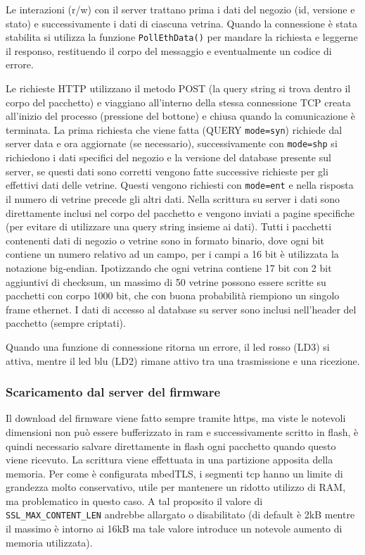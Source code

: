 
Le interazioni (r/w) con il server trattano prima i dati del negozio (id, versione e stato) e successivamente i dati di ciascuna vetrina. Quando la connessione \`e stata stabilita si utilizza la funzione \texttt{PollEthData()} per mandare la richiesta e leggerne il responso, restituendo il corpo del messaggio e eventualmente un codice di errore. 

Le richieste HTTP utilizzano il metodo POST (la query string si trova dentro il corpo del pacchetto) e viaggiano all'interno della stessa connessione TCP creata all'inizio del processo (pressione del bottone) e chiusa quando la comunicazione \`e terminata. La prima richiesta che viene fatta (QUERY \texttt{mode=syn}) richiede dal server data e ora aggiornate (se necessario), successivamente con \texttt{mode=shp} si richiedono i dati specifici del negozio e la versione del database presente sul server, se questi dati sono corretti vengono fatte successive richieste per gli effettivi dati delle vetrine. Questi vengono richiesti con \texttt{mode=ent} e nella risposta il numero di vetrine precede gli altri dati. Nella scrittura su server i dati sono direttamente inclusi nel corpo del pacchetto e vengono inviati a pagine specifiche (per evitare di utilizzare una query string insieme ai dati). Tutti i pacchetti contenenti dati di negozio o vetrine sono in formato binario, dove ogni bit contiene un numero relativo ad un campo, per i campi a 16 bit \`e utilizzata la notazione big-endian.
Ipotizzando che ogni vetrina contiene 17 bit con 2 bit aggiuntivi di checksum, un massimo di 50 vetrine possono essere scritte su pacchetti con corpo 1000 bit, che con buona probabilit\`a riempiono un singolo frame ethernet. I dati di accesso al database su server sono inclusi nell'header del pacchetto (sempre criptati).

Quando una funzione di connessione ritorna un errore, il led rosso (LD3) si attiva, mentre il led blu (LD2) rimane attivo tra una trasmissione e una ricezione.

\subsubsection{Scaricamento dal server del firmware}


Il download del firmware viene fatto sempre tramite https, ma viste le notevoli dimensioni non pu\`o essere bufferizzato in ram e successivamente scritto in flash, \`e quindi necessario salvare direttamente in flash ogni pacchetto quando questo viene ricevuto. La scrittura viene effettuata in una partizione apposita della memoria. Per come \`e configurata mbedTLS, i segmenti tcp hanno un limite di grandezza molto conservativo, utile per mantenere un ridotto utilizzo di RAM, ma problematico in questo caso. A tal proposito il valore di \texttt{SSL\_MAX\_CONTENT\_LEN} andrebbe allargato o disabilitato (di default \`e 2kB mentre il massimo \`e intorno ai 16kB ma tale valore introduce un notevole aumento di memoria utilizzata). 

